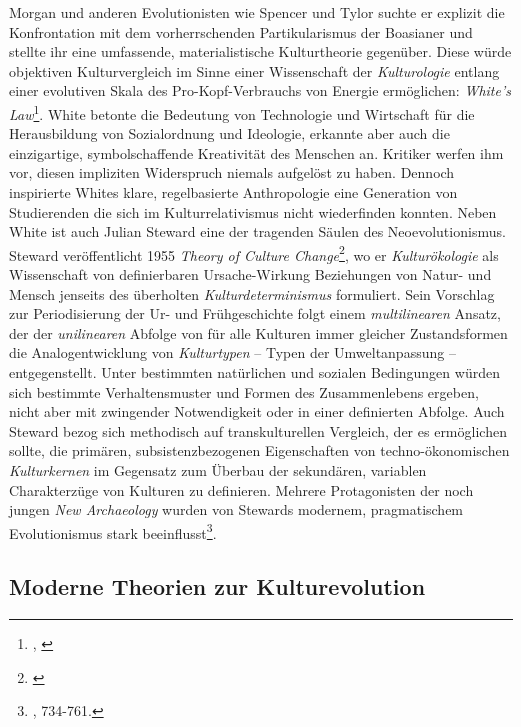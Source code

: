 \documentclass[openany,twoside,twocolumn]{book}
\let\rmarkdownfootnote\footnote%
\def\footnote{\protect\rmarkdownfootnote}
\begin{document}
Morgan und anderen Evolutionisten wie Spencer und Tylor suchte er
explizit die Konfrontation mit dem vorherrschenden Partikularismus der
Boasianer und stellte ihr eine umfassende, materialistische
Kulturtheorie gegenüber. Diese würde objektiven Kulturvergleich im Sinne
einer Wissenschaft der \emph{Kulturologie} entlang einer evolutiven
Skala des Pro-Kopf-Verbrauchs von Energie ermöglichen: \emph{White's
Law}\footnote{\textcite{white_energy_1943},
  \textcite{white_science_1949}}. White betonte die Bedeutung von
Technologie und Wirtschaft für die Herausbildung von Sozialordnung und
Ideologie, erkannte aber auch die einzigartige, symbolschaffende
Kreativität des Menschen an. Kritiker werfen ihm vor, diesen impliziten
Widerspruch niemals aufgelöst zu haben. Dennoch inspirierte Whites
klare, regelbasierte Anthropologie eine Generation von Studierenden die
sich im Kulturrelativismus nicht wiederfinden konnten. Neben White ist
auch Julian Steward eine der tragenden Säulen des Neoevolutionismus.
Steward veröffentlicht 1955 \emph{Theory of Culture Change}\footnote{\textcite{steward_theory_1955}},
wo er \emph{Kulturökologie} als Wissenschaft von definierbaren
Ursache-Wirkung Beziehungen von Natur- und Mensch jenseits des
überholten \emph{Kulturdeterminismus} formuliert. Sein Vorschlag zur
Periodisierung der Ur- und Frühgeschichte folgt einem
\emph{multilinearen} Ansatz, der der \emph{unilinearen} Abfolge von für
alle Kulturen immer gleicher Zustandsformen die Analogentwicklung von
\emph{Kulturtypen} -- Typen der Umweltanpassung -- entgegenstellt. Unter
bestimmten natürlichen und sozialen Bedingungen würden sich bestimmte
Verhaltensmuster und Formen des Zusammenlebens ergeben, nicht aber mit
zwingender Notwendigkeit oder in einer definierten Abfolge. Auch Steward
bezog sich methodisch auf transkulturellen Vergleich, der es ermöglichen
sollte, die primären, subsistenzbezogenen Eigenschaften von
techno-ökonomischen \emph{Kulturkernen} im Gegensatz zum Überbau der
sekundären, variablen Charakterzüge von Kulturen zu definieren. Mehrere
Protagonisten der noch jungen \emph{New Archaeology} wurden von Stewards
modernem, pragmatischem Evolutionismus stark beeinflusst\footnote{\textcite{petermann_geschichte_2004},
  734-761.}.

\hypertarget{evolutionism-modern-theories}{%
\subsection{Moderne Theorien zur
Kulturevolution}\label{evolutionism-modern-theories}}
\end{document}
